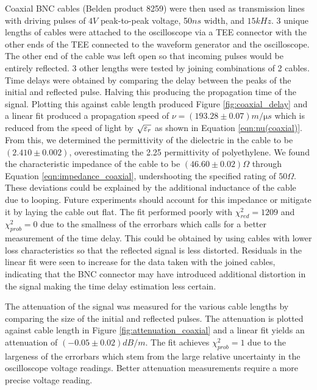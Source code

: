 \documentclass[
	a4paper, %
	10pt, %
	twoside, %
]{journal}
\begin{document}
Coaxial BNC cables (Belden product 8259) were then used as transmission lines with driving pulses of $4\unit{V}$ peak-to-peak voltage, 50$\unit{ns}$ width, and $15\unit{kHz}$. 3 unique lengths of cables were attached to the oscilloscope via a TEE connector with the other ends of the TEE connected to the waveform generator and the oscilloscope. The other end of the cable was left open so that incoming pulses would be entirely reflected. 3 other lengths were tested by joining combinations of 2 cables. Time delays were obtained by comparing the delay between the peaks of the initial and reflected pulse. Halving this producing the propagation time of the signal. Plotting this against cable length produced Figure \ref{fig:coaxial_delay} and a linear fit produced a propagation speed of $\nu = (193.28 \pm 0.07)\unit{m/\micro s}$ which is reduced from the speed of light by $\sqrt{\varepsilon_r}$ as shown in Equation \ref{eqn:nu(coaxial)}. From this, we determined the permittivity of the dielectric in the cable to be $(2.410 \pm 0.002)$, overestimating the 2.25 permittivity of polyethylene. We found the characteristic impedance of the cable to be $(46.60 \pm 0.02)\Omega$ through Equation \ref{eqn:impedance_coaxial}, undershooting the specified rating of $50\Omega$. These deviations could be explained by the additional inductance of the cable due to looping. Future experiments should account for this impedance or mitigate it by laying the cable out flat. The fit performed poorly with $\chi^2_{red} = 1209$ and $\chi^2_{prob} = 0$ due to the smallness of the errorbars which calls for a better measurement of the time delay. This could be obtained by using cables with lower loss characteristics so that the reflected signal is less distorted. Residuals in the linear fit were seen to increase for the data taken with the joined cables, indicating that the BNC connector may have introduced additional distortion in the signal making the time delay estimation less certain.

The attenuation of the signal was measured for the various cable lengths by comparing the size of the initial and reflected pulses. The attenuation is plotted against cable length in Figure \ref{fig:attenuation_coaxial} and a linear fit yields an attenuation of $(-0.05 \pm 0.02)\unit{dB/m}$. The fit achieves $\chi^2_{prob} = 1$ due to the largeness of the errorbars which stem from the large relative uncertainty in the oscilloscope voltage readings. Better attenuation measurements require a more precise voltage reading. 
\end{document}
